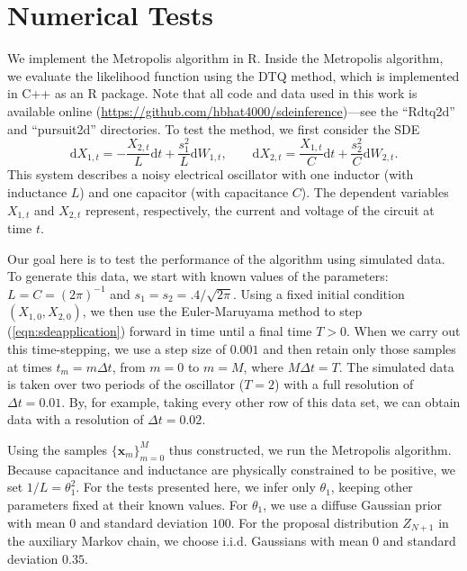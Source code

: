 \documentclass[graybox]{svmult}
\begin{document}
\section{Numerical Tests}
\label{sec:3}
We implement the Metropolis algorithm in R. Inside the Metropolis
algorithm, we evaluate the  likelihood function using the DTQ method,
which is implemented in C++ as an R package.  Note that all code and
data used in this work is available online
(\url{https://github.com/hbhat4000/sdeinference})---see the ``Rdtq2d'' and
``pursuit2d'' directories.
To test the method, we first consider the SDE
\begin{equation}
\label{eqn:sdeapplication}
\mathrm{d}X_{1,t} =  -\frac{X_{2,t}}{L}\mathrm{d}t + \frac{s_1^2}{L} \mathrm{d}W_{1,t}, \qquad
\mathrm{d}X_{2,t} = \frac{X_{1,t}}{C}\mathrm{d}t + \frac{s_2^2}{C} \mathrm{d}W_{2,t}.
\end{equation}
This system describes a noisy electrical oscillator with one inductor (with inductance $L$) and one capacitor (with capacitance $C$).  The dependent variables $X_{1,t}$ and $X_{2,t}$ represent, respectively, the current and voltage of the circuit at time $t$.

Our goal here is to test the performance of the algorithm using
simulated data.  To generate this data, we start with known values of
the parameters: $L = C = (2 \pi)^{-1}$ and $s_1 =  s_2 = .4/\sqrt{2 \pi}$.
Using a fixed initial condition $(X_{1,0},X_{2,0})$, we then use the
Euler-Maruyama method to step (\ref{eqn:sdeapplication}) forward in
time until a final time $T > 0$.  When we carry out this
time-stepping, we use a step size of $0.001$ and then retain only
those samples at times $t_m = m \Delta t$, from $m = 0$ to $m = M$,
where $M \Delta t = T$.  The simulated data is taken over two periods of the oscillator ($T = 2$) with a full resolution of $\Delta t = 0.01$.  By, for example, taking every other row of this data set, we can obtain data with a resolution of $\Delta t = 0.02$.

Using the samples $\{ \mathbf{x}_m \}_{m=0}^M$ thus constructed, we
run the Metropolis algorithm.  Because capacitance and inductance are
physically constrained to be positive, we set $1/L = \theta_1^2$.  For
the tests presented here, we infer only $\theta_1$, keeping other
parameters fixed at their known values.   For $\theta_1$, we use a diffuse Gaussian prior with mean $0$ and standard deviation $100$.  For the proposal distribution $Z_{N+1}$ in the auxiliary Markov chain, we choose i.i.d. Gaussians with mean $0$ and standard deviation $0.35$.
\end{document}

